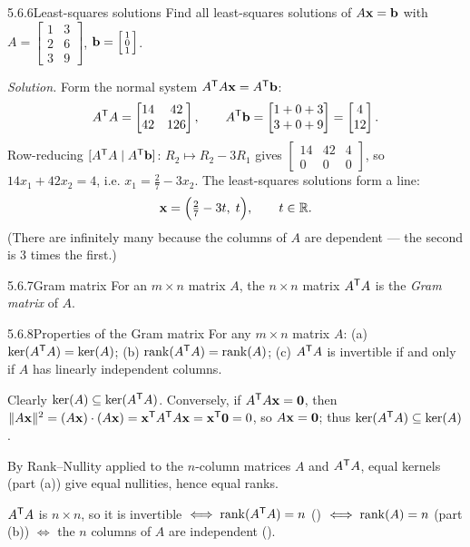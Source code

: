 \begin{exmp}{5.6.6}{Least-squares solutions}
Find all least-squares solutions of $A\mathbf{x}=\mathbf{b}$ with $A=\left[\begin{smallmatrix}1&3\\2&6\\3&9\end{smallmatrix}\right]$, $\mathbf{b}=\left[\begin{smallmatrix}1\\0\\1\end{smallmatrix}\right]$.

\smallskip
\noindent\textit{Solution.} Form the normal system $A^{\mathsf{T}} A\mathbf{x}=A^{\mathsf{T}}\mathbf{b}$:
\[
A^{\mathsf{T}} A=\begin{bmatrix}14&42\\42&126\end{bmatrix},\qquad A^{\mathsf{T}}\mathbf{b}=\begin{bmatrix}1+0+3\\3+0+9\end{bmatrix}=\begin{bmatrix}4\\12\end{bmatrix}.
\]
Row-reducing $[A^{\mathsf{T}} A\mid A^{\mathsf{T}}\mathbf{b}]$: $R_2\mapsto R_2-3R_1$ gives $\left[\begin{array}{cc|c}14&42&4\\0&0&0\end{array}\right]$, so $14x_1+42x_2=4$, i.e. $x_1=\tfrac{2}{7}-3x_2$. The least-squares solutions form a line:
\[
\mathbf{x}=\Bigl(\tfrac27-3t,\;t\Bigr),\qquad t\in\mathbb{R}.
\]
(There are infinitely many because the columns of $A$ are dependent --- the second is $3$ times the first.)
\end{exmp}

\begin{defns}{5.6.7}{Gram matrix}
For an $m\times n$ matrix $A$, the $n\times n$ matrix $A^{\mathsf{T}} A$ is the \emph{Gram matrix} of $A$.
\end{defns}

\begin{thms}{5.6.8}{Properties of the Gram matrix}
For any $m\times n$ matrix $A$:
\textup{(a)} $\ker(A^{\mathsf{T}} A)=\ker(A)$;
\textup{(b)} $\operatorname{rank}(A^{\mathsf{T}} A)=\operatorname{rank}(A)$;
\textup{(c)} $A^{\mathsf{T}} A$ is invertible if and only if $A$ has linearly independent columns.
\end{thms}

\begin{prf}
 Clearly $\ker(A)\subseteq\ker(A^{\mathsf{T}} A)$. Conversely, if $A^{\mathsf{T}} A\mathbf{x}=\mathbf{0}$, then $\lVert A\mathbf{x} \rVert^2=(A\mathbf{x})\cdot(A\mathbf{x})=\mathbf{x}^{\mathsf{T}} A^{\mathsf{T}} A\mathbf{x}=\mathbf{x}^{\mathsf{T}}\mathbf{0}=0$, so $A\mathbf{x}=\mathbf{0}$; thus $\ker(A^{\mathsf{T}} A)\subseteq\ker(A)$.

 By Rank--Nullity applied to the $n$-column matrices $A$ and $A^{\mathsf{T}} A$, equal kernels (part (a)) give equal nullities, hence equal ranks.

 $A^{\mathsf{T}} A$ is $n\times n$, so it is invertible $\iff\operatorname{rank}(A^{\mathsf{T}} A)=n$ () $\iff\operatorname{rank}(A)=n$ (part (b)) $\iff$ the $n$ columns of $A$ are independent ().
\end{prf}

